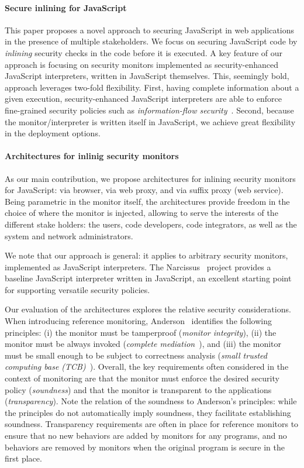 \documentclass{llncs}
\begin{document}
\paragraph{Secure inlining for JavaScript}
This paper proposes a novel approach to securing JavaScript in web
applications in the presence of multiple stakeholders.
%
We focus on securing JavaScript code by \emph{inlining}
security checks in the code before it is executed.
%
A key feature
of our approach is focusing on security monitors implemented as
security-enhanced JavaScript interpreters, written in JavaScript
themselves. This, seemingly bold, approach leverages two-fold
flexibility. First, having complete information about a given
execution, security-enhanced JavaScript interpreters are able to
enforce fine-grained security policies such as \emph{information-flow
security}~\cite{Sabelfeld:Myers:JSAC}. Second, because the monitor/interpreter is written itself in
JavaScript, we achieve great flexibility in the deployment options.

\paragraph{Architectures for inlinig security monitors}
As our main contribution,
we propose architectures for inlining security monitors for JavaScript: via
browser, via web proxy, and via suffix proxy (web service). 
%
Being parametric in the monitor itself,
the architectures provide freedom in the choice of where the monitor is
injected, allowing to serve the interests of the different stake
holders: the users, code developers, code
integrators, as well as the system and network administrators.

We note that our approach is general: it applies to arbitrary security
monitors, implemented as JavaScript interpreters. The 
 Narcissus~\cite{Narcissus} project provides a baseline JavaScript
 interpreter written in JavaScript, an excellent starting
 point for supporting versatile security policies.

Our evaluation of the architectures explores the relative security
considerations.
When introducing reference monitoring, Anderson~\cite{Anderson:72}
identifies the following principles:
(i) the monitor must be tamperproof (\emph{monitor integrity}),
(ii) the monitor must be always invoked (\emph{complete
  mediation}~\cite{Saltzer:Schroeder:TCB}), and
(iii) the monitor must be small enough to be subject to correctness
analysis (\emph{small trusted computing base
  (TCB)}~\cite{Saltzer:Schroeder:TCB,DBLP:dblp_conf/sosp/Rushby81}). Overall,
the key requirements often considered in the context of monitoring are 
that the monitor must enforce the desired security policy
(\emph{soundness}) and that the monitor is transparent to the
applications (\emph{transparency}). Note the relation of
the soundness to Anderson's principles: while the principles do not
automatically imply soundness, they facilitate establishing soundness. 
Transparency requirements are often in place for reference monitors to
ensure that no new behaviors are added by monitors for any programs, and no
behaviors are removed by monitors when the
original program is secure in the first place.
\end{document}
